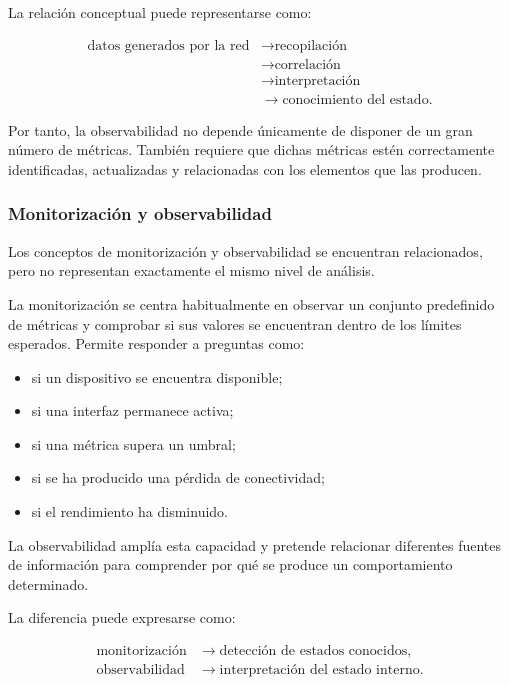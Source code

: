 La relación conceptual puede representarse como:

\[
\begin{aligned}
    \text{datos generados por la red}
    &\longrightarrow
    \text{recopilación}\\
    &\longrightarrow
    \text{correlación}\\
    &\longrightarrow
    \text{interpretación}\\
    &\longrightarrow
    \text{conocimiento del estado}.
\end{aligned}
\]

Por tanto, la observabilidad no depende únicamente de disponer de un gran
número de métricas. También requiere que dichas métricas estén
correctamente identificadas, actualizadas y relacionadas con los
elementos que las producen.


\subsubsection*{Monitorización y observabilidad}

Los conceptos de monitorización y observabilidad se encuentran
relacionados, pero no representan exactamente el mismo nivel de análisis.

La monitorización se centra habitualmente en observar un conjunto
predefinido de métricas y comprobar si sus valores se encuentran dentro
de los límites esperados. Permite responder a preguntas como:

\begin{itemize}
    \item si un dispositivo se encuentra disponible;

    \item si una interfaz permanece activa;

    \item si una métrica supera un umbral;

    \item si se ha producido una pérdida de conectividad;

    \item si el rendimiento ha disminuido.
\end{itemize}

La observabilidad amplía esta capacidad y pretende relacionar diferentes
fuentes de información para comprender por qué se produce un
comportamiento determinado.

La diferencia puede expresarse como:

\[
\begin{aligned}
    \text{monitorización}
    &\longrightarrow
    \text{detección de estados conocidos},\\
    \text{observabilidad}
    &\longrightarrow
    \text{interpretación del estado interno}.
\end{aligned}
\]

